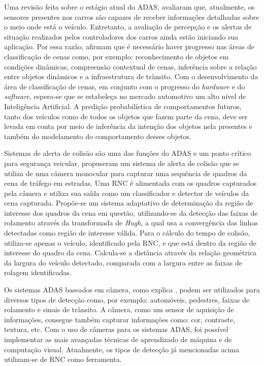 \documentclass[
	12pt,				%
    oneside,			%
	a4paper,			%
	english,			%
	french,				%
	spanish,			%
	brazil,				%
	]{abntex2}
\begin{document}
Uma revisão feita sobre o estágio atual do ADAS,  avaliaram que, atualmente, os sensores presentes nos carros são capazes de receber informações detalhadas sobre o meio onde está o veículo. Entretanto, a avaliação de percepção e os alertas de situação realizados pelos controladores dos carros ainda estão iniciando sua aplicação. Por essa razão, afirmam que é necessário haver progresso nas áreas de classificação de cenas como, por exemplo: reconhecimento de objetos em condições dinâmicas, compreensão contextual de cenas, inferência sobre a relação entre objetos dinâmicos e a infraestrutura de trânsito. Com o desenvolvimento da área de classificação de cenas, em conjunto com o progresso do \textit{hardware} e do \textit{software}, espera-se que se estabeleça no mercado automotivo um alto nível de Inteligência Artificial. A predição probabilística de comportamentos futuros, tanto dos veículos como de todos os objetos que fazem parte da cena, deve ser levada em conta por meio de inferência da intenção dos objetos nela presentes e também do modelamento do comportamento desses objetos.

Sistemas de alerta de colisão são uma das funções do ADAS e um ponto crítico para segurança veicular,  propuseram um sistema de alerta de colisão que se utiliza de uma câmera monocular para capturar uma sequência de quadros da cena de tráfego em estradas. Uma RNC é alimentada com os quadros capturados pela câmera e utiliza sua saída como um classificador e detector de veículos da cena capturada. Propõe-se um sistema adaptativo de determinação da região de interesse dos quadros da cena em questão, utilizando-se da detecção das faixas de rolamento através da transformada de \textit{Hugh}, a qual usa a convergência das linhas detectadas como região de interesse válida. Para o cálculo do tempo de colisão, utiliza-se apenas o veículo, identificado pela RNC, e que está dentro da região de interesse do quadro da cena. Calcula-se a distância através da relação geométrica da largura do veículo detectado, comparada com a largura entre as faixas de rolagem identificadas.

Os sistemas ADAS baseados em câmera, como explica , podem ser utilizados para diversos tipos de detecção como, por exemplo: automóveis, pedestres, faixas de rolamento e sinais de trânsito. A câmera, como um sensor de aquisição de informações, consegue também capturar informações como: cor, contraste, textura, etc. Com o uso de câmeras para os sistemas ADAS, foi possível implementar as mais avançadas técnicas de aprendizado de máquina e de computação visual. Atualmente, os tipos de detecção já mencionadas acima utilizam-se de RNC como ferramenta.
\end{document}
